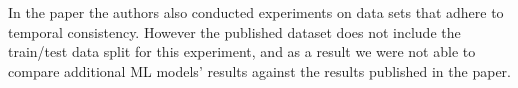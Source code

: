 In the paper the authors also conducted experiments
on data sets that adhere to temporal consistency. However
the published dataset does not include the train/test data split
for this experiment, and as a result we were not able
to compare additional ML models' results against the results
published in the paper.


